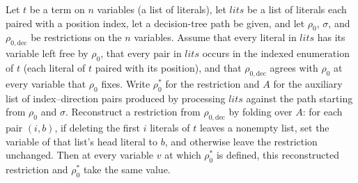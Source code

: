 \begin{lemma}
\label{SwitchingLemma.roundtrip_inv_hD'}
\leanok
{}
Let $t$ be a term on $n$ variables (a list of literals), let $\mathit{lits}$ be a list
of literals each paired with a position index, let a decision-tree path be given, and
let $\rho_0$, $\sigma$, and $\rho_{0,\mathrm{dec}}$ be restrictions on the $n$
variables. Assume that every literal in $\mathit{lits}$ has its variable left free by
$\rho_0$, that every pair in $\mathit{lits}$ occurs in the indexed enumeration of $t$
(each literal of $t$ paired with its position), and that $\rho_{0,\mathrm{dec}}$ agrees
with $\rho_0$ at every variable that $\rho_0$ fixes. Write $\rho_0^{\ast}$ for the
restriction and $A$ for the auxiliary list of index–direction pairs produced by
processing $\mathit{lits}$ against the path starting from $\rho_0$ and $\sigma$.
Reconstruct a restriction from $\rho_{0,\mathrm{dec}}$ by folding over $A$: for each
pair $(i,b)$, if deleting the first $i$ literals of $t$ leaves a nonempty list, set the
variable of that list's head literal to $b$, and otherwise leave the restriction
unchanged. Then at every variable $v$ at which $\rho_0^{\ast}$ is defined, this
reconstructed restriction and $\rho_0^{\ast}$ take the same value.
\end{lemma}

